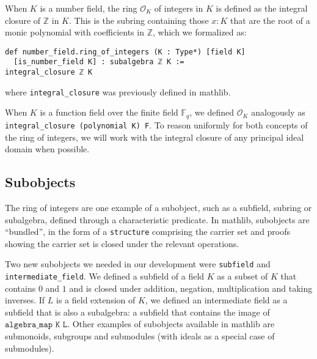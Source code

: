 \documentclass[a4paper,USenglish,cleveref, autoref, thm-restate]{lipics-v2021}
\newcommand{\lean}[1]{\texttt{#1}\xspace} %
\newcommand*{\OK}[1][K]{\mathcal{O}_{#1}}
\newcommand*{\Fq}[1][q]{\mathbb{F}_{#1}}
\newcommand{\mathlib}{\textsf{mathlib}\xspace}
\newcommand{\Q}{\mathbb{Q}}
\newcommand{\Z}{\mathbb{Z}}
\begin{document}
When $K$ is a number field, the ring $\OK$ of integers in $K$ is defined as the integral closure of $\Z$ in $K$.
This is the subring containing those $x : K$ that are the root of a monic polynomial with coefficients in $\Z$, which we formalized as:
\begin{lstlisting}
def number_field.ring_of_integers (K : Type*) [field K]
  [is_number_field K] : subalgebra ℤ K :=
integral_closure ℤ K
\end{lstlisting}
where \lean{integral\_closure} was previously defined in \mathlib.

When $K$ is a function field over the finite field $\Fq$, we defined $\OK$ analogously as \lean{integral\_closure (polynomial K) F}.
To reason uniformly for both concepts of the ring of integers,
we will work with the integral closure of any principal ideal domain when possible.

\subsection{Subobjects} \label{sec:subobjects}

The ring of integers are one example of a subobject, such as a subfield, subring or subalgebra, defined through a characteristic predicate.
In \mathlib, subobjects are ``bundled'', in the form of a \lean{structure} comprising the carrier set and proofs showing the carrier set is closed under the relevant operations.

Two new subobjects we needed in our development were \lean{subfield} and \lean{intermediate\-\_field}.
We defined a subfield of a field $K$ as a subset of $K$ that contains $0$ and $1$ and is closed under addition, negation, multiplication and taking inverses.
If $L$ is a field extension of $K$, we defined an intermediate field as a subfield that is also a subalgebra: a subfield that contains the image of $\lean{algebra\_map K L}$.
Other examples of subobjects available in \mathlib are submonoids, subgroups and submodules (with ideals as a special case of submodules).
\end{document}
